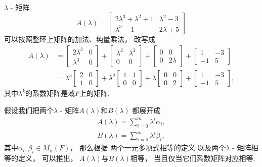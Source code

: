 \begin{example}
\(\lambda\) - 矩阵\[
	A(\lambda) = \begin{bmatrix}
		2 \lambda^3 + \lambda^2 + 1 & \lambda^2 - 3 \\
		\lambda^3 - 1 & 2 \lambda + 5
	\end{bmatrix}
\]可以按照整环上矩阵的加法、纯量乘法，
改写成\begin{align*}
	A(\lambda)
	&= \begin{bmatrix}
		2 \lambda^3 & 0 \\
		\lambda^3 & 0
	\end{bmatrix}
	+ \begin{bmatrix}
		\lambda^2 & \lambda^2 \\
		0 & 0
	\end{bmatrix}
	+ \begin{bmatrix}
		0 & 0 \\
		0 & 2 \lambda
	\end{bmatrix}
	+ \begin{bmatrix}
		1 & -3 \\
		-1 & 5
	\end{bmatrix} \\
	&= \lambda^3
	\begin{bmatrix}
		2 & 0 \\
		1 & 0
	\end{bmatrix}
	+ \lambda^2
	\begin{bmatrix}
		1 & 1 \\
		0 & 0
	\end{bmatrix}
	+ \lambda
	\begin{bmatrix}
		0 & 0 \\
		0 & 2
	\end{bmatrix}
	+ \begin{bmatrix}
		1 & -3 \\
		-1 & 5
	\end{bmatrix},
\end{align*}
其中\(\lambda^k\)的系数矩阵是域\(F\)上的矩阵.
\end{example}

假设我们把两个\(\lambda\) - 矩阵\(A(\lambda)\)和\(B(\lambda)\)
都展开成\begin{gather*}
	A(\lambda)
	= \sum_{i=0}^m \lambda^i \alpha_i, \\
	B(\lambda)
	= \sum_{i=0}^m \lambda^i \beta_i,
\end{gather*}
其中\(\alpha_i,\beta_i \in M_n(F)\)，
那么根据
两个一元多项式相等的定义
以及两个\(\lambda\) - 矩阵相等的定义，
可以推出，
\(A(\lambda)\)与\(B(\lambda)\)相等，
当且仅当它们系数矩阵对应相等.

